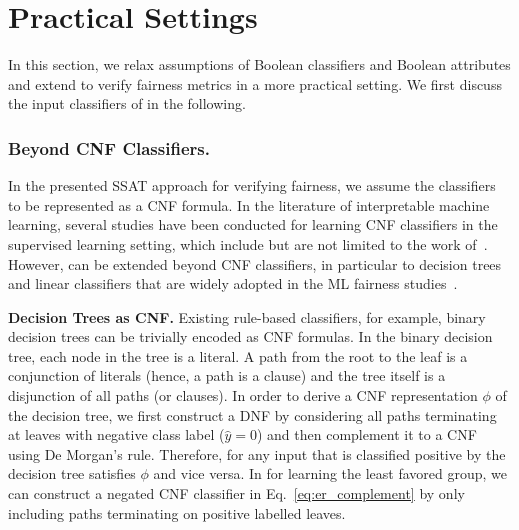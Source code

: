 
\section{Practical Settings}
\label{sec:practical-setting}
In this section, we  relax assumptions of Boolean classifiers and Boolean attributes and extend {\framework} to verify fairness metrics in a more practical setting. We first discuss the input classifiers of {\framework} in the following.

\subsubsection{Beyond CNF Classifiers.}
In the presented SSAT approach for verifying fairness, we assume the classifiers  to be represented as a CNF formula.  In the literature of interpretable machine learning, several studies have been conducted for learning CNF classifiers in the supervised learning setting, which include but are not limited to the work of~\cite{angelino2017learning,malioutov2018mlic,ghosh19incremental,yu2020computing}.  However, {\framework} can be extended beyond CNF classifiers, in particular to decision trees and linear classifiers that are widely adopted in the ML fairness studies~\cite{zemel2013learning,zafar2017fairness,xu2019achieving,zhang2019faht,raff2018fair,friedler2019comparative}.

\textbf{Decision Trees as CNF.} Existing  rule-based classifiers, for example, binary decision trees  can be trivially encoded as  CNF formulas.  In the binary decision tree, each node in the tree is a literal. A path  from the root to the leaf is a conjunction of literals (hence, a path is a clause) and the tree itself is a disjunction of all paths (or  clauses). In order to derive a CNF representation $ \phi $ of the decision tree, we first construct a DNF by considering all paths terminating at leaves with negative class label ($ \hat{y} = 0 $) and then complement it to a CNF using De Morgan's rule. Therefore, for any input that is classified positive by the decision tree satisfies $ \phi $ and vice versa. In {\frameworklearn} for learning the least favored group, we can construct a negated CNF classifier in Eq.~\ref{eq:er_complement} by only including paths terminating on positive labelled leaves. 

